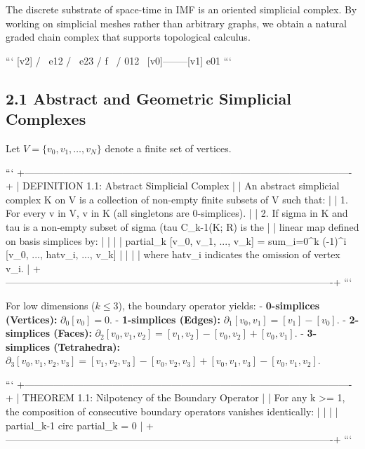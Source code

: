 \documentclass[11pt,twoside,openright]{amsbook}
\begin{document}
The discrete substrate of space-time in IMF is an oriented simplicial complex. By working on simplicial meshes rather than arbitrary graphs, we obtain a natural graded chain complex that supports topological calculus.

```
       [v2]
       /  \
  e12 /    \ e23
     /  f   \
    /   012  \
  [v0]--------[v1]
        e01
```

\subsection{2.1 Abstract and Geometric Simplicial Complexes}

Let $V = \{v_0, v_1, \dots, v_N\}$ denote a finite set of vertices.

```
+----------------------------------------------------------------------------------------------------+
| DEFINITION 1.1: Abstract Simplicial Complex                                                        |
| An abstract simplicial complex K on V is a collection of non-empty finite subsets of V such that:  |
| 1. For every v in V, {v} in K (all singletons are 0-simplices).                                    |
| 2. If sigma in K and tau is a non-empty subset of sigma (tau  C_{k-1}(K; R) is the   |
| linear map defined on basis simplices by:                                                          |
|                                                                                                    |
|   partial_k [v_0, v_1, ..., v_k] = sum_{i=0}^k (-1)^i [v_0, ..., hat{v}_i, ..., v_k]               |
|                                                                                                    |
| where hat{v}_i indicates the omission of vertex v_i.                                               |
+----------------------------------------------------------------------------------------------------+
```

For low dimensions ($k \le 3$), the boundary operator yields:
- \textbf{0-simplices (Vertices):} $\partial_0 [v_0] = 0$.
- \textbf{1-simplices (Edges):} $\partial_1 [v_0, v_1] = [v_1] - [v_0]$.
- \textbf{2-simplices (Faces):} $\partial_2 [v_0, v_1, v_2] = [v_1, v_2] - [v_0, v_2] + [v_0, v_1]$.
- \textbf{3-simplices (Tetrahedra):} $\partial_3 [v_0, v_1, v_2, v_3] = [v_1, v_2, v_3] - [v_0, v_2, v_3] + [v_0, v_1, v_3] - [v_0, v_1, v_2]$.

```
+----------------------------------------------------------------------------------------------------+
| THEOREM 1.1: Nilpotency of the Boundary Operator                                                   |
| For any k >= 1, the composition of consecutive boundary operators vanishes identically:          |
|                                                                                                    |
|   partial_{k-1} circ partial_k = 0                                                                 |
+----------------------------------------------------------------------------------------------------+
```
\end{document}
